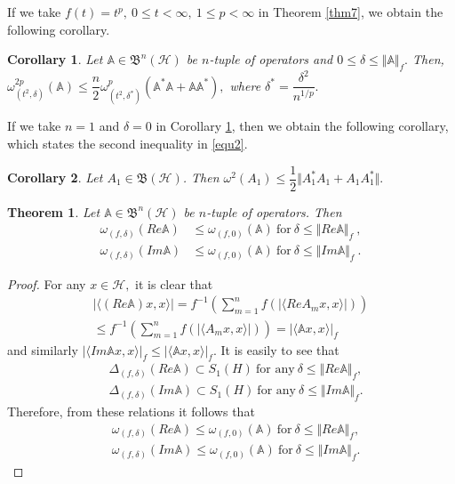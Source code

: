 \documentclass[12pt]{article}
\newtheorem{theorem}{Theorem}
\newtheorem{corollary}{Corollary}
\begin{document}
If we take $ f(t)=t^{p}, \ 0\leq t<\infty, \ 1\leq p< \infty $ in Theorem \ref{thm7}, we obtain the following corollary.
\begin{corollary}
\label{cor9}
Let $\mathbb{A} \in \mathfrak{B}^{n}(\mathcal{H})$ be $n$-tuple of operators and $0\leq \delta \leq \Vert \mathbb{A}\Vert_f.$ Then,
\(
\omega_{(t^{2},\delta )}^{2p}(\mathbb{A}  ) \leq \dfrac{n}{2}\omega_{(t^{2},\delta^{*})}^{p}\left( \mathbb{A}^{*}\mathbb{A}+\mathbb{A}\mathbb{A}^{*} \right),
\)
where $ \delta^{*}=\dfrac{\delta^{2}}{n^{1/p}}  . $
\end{corollary}

If we take $ n=1 $ and $ \delta=0 $ in Corollary \ref{cor9}, then we obtain the following corollary, which states the second inequality in \eqref{equ2}.
\begin{corollary}
\label{cor10}
Let $A_{1} \in \mathfrak{B}(\mathcal{H})$. Then
\(
\omega^{2}(A_{1})\leq \dfrac{1}{2} \Vert A_{1}^{*}A_{1}+A_{1}A_{1}^{*} \Vert .
\)
\end{corollary}
\begin{theorem}
\label{thm8}
Let $ \mathbb{A}\in\mathfrak{B}^{n}(\mathcal{H}) $ be $n$-tuple of operators. Then
\begin{align*}
\omega_{(f,\delta)}(Re\mathbb{A}) & \leq \omega _{(f,0)}(\mathbb{A})  \ \text{for} \ \delta\leq \Vert Re\mathbb{A} \Vert_{f}\ ,
\\
\omega_{(f,\delta)}(Im\mathbb{A}) & \leq \omega _{(f,0)}(\mathbb{A})  \ \text{for} \  \delta\leq \Vert Im\mathbb{A} \Vert_{f}\ .
\end{align*}
\end{theorem}
\begin{proof}
For any $ x\in \mathcal{H}, $ it is clear that
\begin{multline*}
\vert \langle (Re\mathbb{A})x,x\rangle \vert = f^{-1}\left( \sum\limits_{m=1}^{n}f\left( \vert \langle ReA_{m}x,x\rangle \vert \right)   \right)\\
\leq f^{-1}\left( \sum\limits_{m=1}^{n}f\left( \vert \langle A_{m}x,x\rangle \vert \right)  \right)
= \vert \langle \mathbb{A}x,x \rangle \vert_{f}
\end{multline*}
and similarly
\(
\vert \langle Im\mathbb{A}x,x\rangle \vert_{f} \leq \vert \langle \mathbb{A}x,x \rangle \vert_{f} .
\)
It is easily to see that
\begin{align*}
& \Delta_{(f,\delta)}(Re\mathbb{A})\subset S_{1}(H) \ \text{for any} \ \delta \leq \Vert Re\mathbb{A} \Vert_{f},
\\
& \Delta_{(f,\delta)}(Im\mathbb{A})\subset S_{1}(H) \ \text{for any} \ \delta \leq \Vert Im\mathbb{A} \Vert_{f}.
\end{align*}
Therefore, from these relations it follows that
\begin{align*}
&\omega_{(f,\delta)}(Re\mathbb{A})\leq \omega _{(f,0)}(\mathbb{A})  \ \text{for} \ \delta\leq \Vert Re\mathbb{A} \Vert_{f},
\\
&\omega_{(f,\delta)}(Im\mathbb{A})\leq \omega _{(f,0)}(\mathbb{A})  \ \text{for} \  \delta\leq \Vert Im\mathbb{A} \Vert_{f} . \tag*{\qedhere}
\end{align*}
\end{proof}
\end{document}
